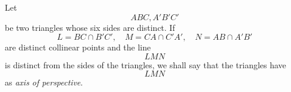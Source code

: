 Let $$ABC, A'B'C'$$ be two triangles whose six sides are distinct. If
$$L = BC \cap B'C',\quad M = CA \cap C'A',\quad N = AB \cap A'B'$$
are distinct collinear points and the line $$LMN$$ is distinct from the sides of the triangles, we shall say that the triangles have $$LMN$$ as \textit{axis of perspective}.
